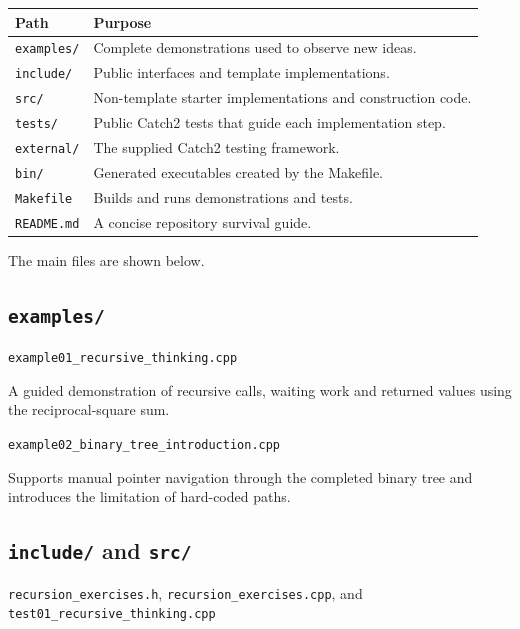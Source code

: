 \documentclass{csc2059practical}
\begin{document}
\begin{center}
\begin{tabular}{ll}
\toprule
\textbf{Path} & \textbf{Purpose} \\
\midrule
\texttt{examples/} & Complete demonstrations used to observe new ideas. \\
\texttt{include/} & Public interfaces and template implementations. \\
\texttt{src/} & Non-template starter implementations and construction code. \\
\texttt{tests/} & Public Catch2 tests that guide each implementation step. \\
\texttt{external/} & The supplied Catch2 testing framework. \\
\texttt{bin/} & Generated executables created by the Makefile. \\
\texttt{Makefile} & Builds and runs demonstrations and tests. \\
\texttt{README.md} & A concise repository survival guide. \\
\bottomrule
\end{tabular}
\end{center}

The main files are shown below.

\subsection*{\texttt{examples/}}

\noindent
\texttt{example01\_recursive\_thinking.cpp}

\smallskip

A guided demonstration of recursive calls, waiting work and returned values
using the reciprocal-square sum.

\medskip

\noindent
\texttt{example02\_binary\_tree\_introduction.cpp}

\smallskip

Supports manual pointer navigation through the completed binary tree and
introduces the limitation of hard-coded paths.

\bigskip


\subsection*{\texttt{include/} and \texttt{src/}}

\noindent
\texttt{recursion\_exercises.h},
\texttt{recursion\_exercises.cpp}, and
\texttt{test01\_recursive\_thinking.cpp}
\end{document}
